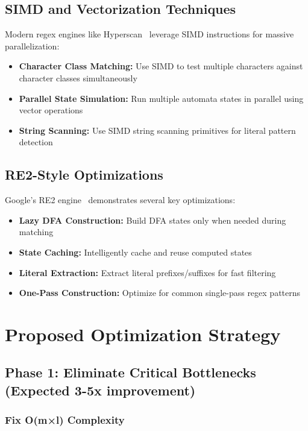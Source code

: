 \documentclass[11pt,a4paper]{article}
\begin{document}
\subsection{SIMD and Vectorization Techniques}

Modern regex engines like Hyperscan~\cite{intel2016hyperscan} leverage SIMD instructions for massive parallelization:

\begin{itemize}
\item \textbf{Character Class Matching:} Use SIMD to test multiple characters against character classes simultaneously
\item \textbf{Parallel State Simulation:} Run multiple automata states in parallel using vector operations
\item \textbf{String Scanning:} Use SIMD string scanning primitives for literal pattern detection
\end{itemize}

\subsection{RE2-Style Optimizations}

Google's RE2 engine~\cite{cox2007regular} demonstrates several key optimizations:

\begin{itemize}
\item \textbf{Lazy DFA Construction:} Build DFA states only when needed during matching
\item \textbf{State Caching:} Intelligently cache and reuse computed states
\item \textbf{Literal Extraction:} Extract literal prefixes/suffixes for fast filtering
\item \textbf{One-Pass Construction:} Optimize for common single-pass regex patterns
\end{itemize}

\section{Proposed Optimization Strategy}

\subsection{Phase 1: Eliminate Critical Bottlenecks (Expected 3-5x improvement)}

\subsubsection{Fix O(m×l) Complexity}
\end{document}
